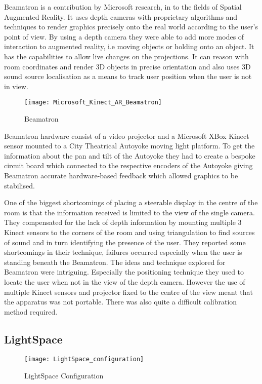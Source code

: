 Beamatron \cite{beamatron} is a contribution by Microsoft research,
in to the fields of Spatial Augmented Reality. It uses depth cameras
with proprietary algorithms and techniques to render graphics precisely
onto the real world according to the user's point of view. By using a
depth camera they were able to add more modes of interaction to augmented
reality, i.e moving objects or holding onto an object. It has the capabilities
to allow live changes on the projections. It can reason with room
coordinates and render 3D objects in precise orientation and also uses 3D
sound source localisation as a means to track user position when the
user is not in view. 
\begin{figure}
\centering
\texttt{[image: Microsoft\_Kinect\_AR\_Beamatron]}
\protect\caption{Beamatron}
\end{figure}
Beamatron hardware consist of a video projector and a Microsoft XBox
Kinect sensor mounted to a City Theatrical Autoyoke\cite{autoyoke}
moving light platform. To get the information about the pan and tilt
of the Autoyoke they had to create a bespoke circuit board which connected
to the respective encoders of the Autoyoke giving Beamatron accurate
hardware-based feedback which allowed graphics to be stabilised. 

One of the biggest shortcomings of placing a steerable display in
the centre of the room is that the information received is limited
to the view of the single camera. They compensated for the lack of
depth information by mounting multiple 3 Kinect sensors to the corners
of the room and using triangulation to find sources of sound and in
turn identifying the presence of the user. They reported some shortcomings
in their technique, failures occurred especially when the user is standing beneath the
Beamatron.
The ideas and technique explored for Beamatron were intriguing. Especially
the positioning technique they used to locate the user when not in
the view of the depth camera. However the use of multiple Kinect sensors
and projector fixed to the centre of the view meant that the apparatus
was not portable. There was also quite a difficult calibration method
required.


\subsection{LightSpace}
\begin{figure}[H]
\centering
\texttt{[image: LightSpace\_configuration]}
\protect\caption{LightSpace Configuration}
\label{lightspace-config}
\end{figure}

